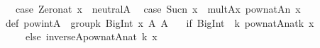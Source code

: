\begin{isabellebody}
\begin{isamarkuptext}
\ \ case\ {}Zero{}nat{}\ x{}\ {}{}\ neutral{}A{}\isanewline
\ \ case\ {}Suc{}n{}{}\ x{}\ {}{}\ mult{}A{}{}x{}\ pow{}nat{}A{}{}n{}\ x{}{}\isanewline
{}\isanewline
\isanewline
def\ pow{}int{}A\ {}\ group{}{}k{}\ BigInt{}\ x{}\ A{}{}\ A\ {}\isanewline
\ \ {}if\ {}BigInt{}{}{}\ {}{}\ k{}\ pow{}nat{}A{}{}nat{}k{}{}\ x{}\isanewline
\ \ \ \ else\ inverse{}A{}{}pow{}nat{}A{}{}nat{}{}{}\ k{}{}{}\ x{}{}{}\isanewline

\end{isamarkuptext}
\end{isabellebody}
